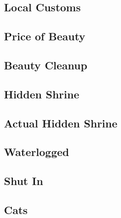 

\subsection{Local Customs}


\subsection{Price of Beauty}


\subsection{Beauty Cleanup}


\subsection{Hidden Shrine}


\subsection{Actual Hidden Shrine}


\subsection{Waterlogged}


\subsection{Shut In}


\subsection{Cats}

